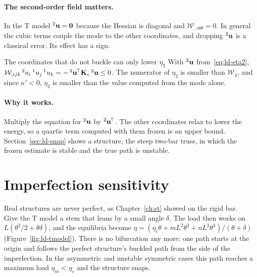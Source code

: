 \paragraph{The second-order field matters.}
%
In the T model ${}^2\mathbf{u} = \mathbf{0}$ because the Hessian is diagonal and
$\mathcal{W}_{,v\theta\theta} = 0$. In general the cubic terms couple the mode to the
other coordinates, and dropping ${}^2\mathbf{u}$ is a classical error. Its effect has a sign.

\begin{gbox}{The coordinates that do not buckle can only lower $\eta_2$}\label{sec:ld-passive}
%
With ${}^2\mathbf{u}$ from~\eqref{eq:ld-eta2},
$\mathcal{W}_{,ijk}\,{}^2u_i\,{}^1u_j\,{}^1u_k = -\,{}^2\mathbf{u}^{\!\top}\mathbf{K}_c\,{}^2\mathbf{u} \le 0$.
The numerator of $\eta_2$ is smaller than $\mathcal{W}_4$, and since $\kappa' < 0$,
$\eta_2$ is smaller than the value computed from the mode alone.
\end{gbox}

\paragraph{Why it works.}
Multiply the equation for ${}^2\mathbf{u}$ by ${}^2\mathbf{u}^{\!\top}$. The other coordinates relax
to lower the energy, so a quartic term computed with them frozen is an upper bound.
Section~\ref{sec:ld-snap} shows a structure, the steep two-bar truss, in which the
frozen estimate is stable and the true path is unstable.

\section{Imperfection sensitivity}\label{sec:ld-imperfect}
%

Real structures are never perfect, as Chapter~\ref{ch:st} showed on the rigid bar.
Give the T model a stem that leans by a small angle $\delta$. The load then works
on $L(\theta^2/2 + \theta\delta)$, and the equilibria become
$\eta = (\eta_c\theta + mL^2\theta^2 + nL^3\theta^3)/(\theta + \delta)$
(Figure~\ref{fig:ld-tmodel}). There is no bifurcation any more: one path starts at
the origin and follows the perfect structure's buckled path from the side of the
imperfection. In the asymmetric and unstable symmetric cases this path reaches a
maximum load $\eta_m < \eta_c$ and the structure snaps.

